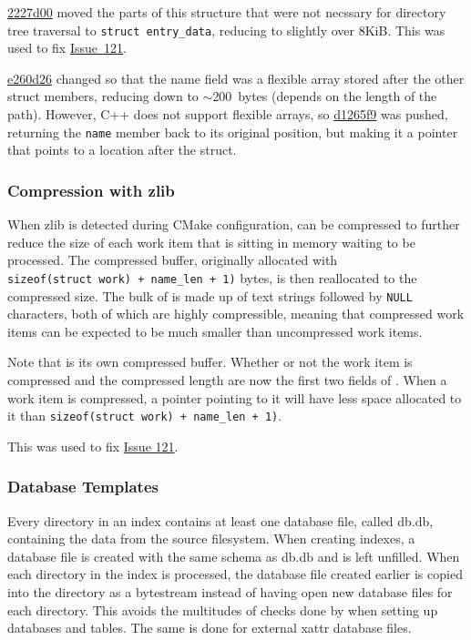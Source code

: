 \href{https://github.com/mar-file-system/GUFI/commit/2227d00665eb6d507ac2052e80616c077a5da853}{2227d00}
moved the parts of this structure that were not necssary for directory
tree traversal to \texttt{struct~entry\_data}, reducing
\work to slightly over 8KiB. This was used to fix
\href{https://github.com/mar-file-system/GUFI/issues/121}{Issue~121}.

\href{https://github.com/mar-file-system/GUFI/commit/e260d26aab0713835defbe2a5b6e1187610dcf3d}{e260d26}
changed \work so that the name field was a flexible
array stored after the other struct members, reducing
\work down to $\sim$200~bytes (depends on the length of the
path). However, C++ does not support flexible arrays, so
\href{https://github.com/mar-file-system/GUFI/commit/d1265f9ee9a5aa4451400f5abb455eb3ad64957c}{d1265f9}
was pushed, returning the \texttt{name} member back to its original
position, but making it a pointer that points to a location after the
struct.

\subsubsection{Compression with zlib}
When zlib is detected during CMake configuration, \work can be
compressed to further reduce the size of each work item that is
sitting in memory waiting to be processed. The compressed buffer,
originally allocated with
\texttt{sizeof(struct~work)~+~name\_len~+~1)} bytes, is then
reallocated to the compressed size. The bulk of \work is made up of
text strings followed by \texttt{NULL} characters, both of which are
highly compressible, meaning that compressed work items can be
expected to be much smaller than uncompressed work items.

Note that \work is its own compressed buffer. Whether
or not the work item is compressed and the compressed length are now
the first two fields of \work. When a work item is
compressed, a pointer pointing to it will have less space allocated to
it than \texttt{sizeof(struct~work)~+~name\_len~+~1)}.

This was used to fix
\href{https://github.com/mar-file-system/GUFI/issues/121}{Issue 121}.

\subsubsection{Database Templates}
Every directory in an index contains at least one database file,
called db.db, containing the \lstat data from the source
filesystem. When creating indexes, a database file is created with
the same schema as db.db and is left unfilled. When each directory in
the index is processed, the database file created earlier is copied
into the directory as a bytestream instead of having \sqlite open new
database files for each directory. This avoids the multitudes of
checks done by \sqlite when setting up databases and tables. The same
is done for external xattr database files.

